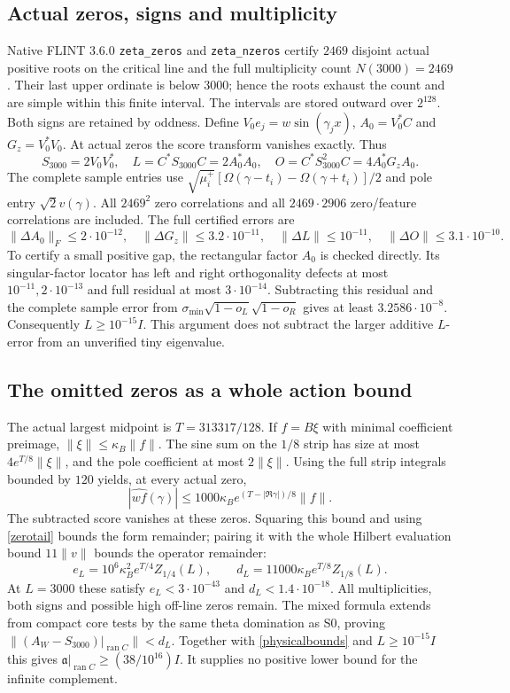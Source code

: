 \documentclass[11pt]{article}
\newcommand{\Ran}{\operatorname{ran}}
\numberwithin{equation}{section}
\begin{document}
\subsection{Actual zeros, signs and multiplicity}
Native FLINT 3.6.0 \texttt{zeta\_zeros} and \texttt{zeta\_nzeros}
\cite{FLINT} certify $2469$ disjoint actual positive roots on the
critical line and the full multiplicity count $N(3000)=2469$.
Their last upper ordinate is below $3000$; hence the roots exhaust
the count and are simple within this finite interval. The intervals
are stored outward over $2^{128}$. Both signs are retained by oddness.
Define $V_0e_j=w\sin(\gamma_jx)$, $A_0=V_0^*C$ and $G_z=V_0^*V_0$.
At actual zeros the score transform vanishes exactly. Thus
\[
 S_{3000}=2V_0V_0^*,\quad L=C^*S_{3000}C=2A_0^*A_0,
 \quad O=C^*S_{3000}^2C=4A_0^*G_zA_0.
\]
The complete sample entries use
$\sqrt{\mu_i^+}[\Omega(\gamma-t_i)-\Omega(\gamma+t_i)]/2$
and pole entry $\sqrt2v(\gamma)$. All $2469^2$ zero correlations and
all $2469\cdot2906$ zero/feature correlations are included.
The full certified errors are
\[
 \|\Delta A_0\|_F\le2\cdot10^{-12},\quad
 \|\Delta G_z\|\le3.2\cdot10^{-11},\quad
 \|\Delta L\|\le10^{-11},\quad\|\Delta O\|\le3.1\cdot10^{-10}.
\]
To certify a small positive gap, the rectangular factor $A_0$ is
checked directly. Its singular-factor locator has left and right
orthogonality defects at most $10^{-11},2\cdot10^{-13}$ and full
residual at most $3\cdot10^{-14}$. Subtracting this residual and
the complete sample error from
$\sigma_{\min}\sqrt{1-o_L}\sqrt{1-o_R}$ gives at least
$3.2586\cdot10^{-8}$. Consequently $L\ge10^{-15}I$.
This argument does not subtract the larger additive $L$-error from
an unverified tiny eigenvalue.

\subsection{The omitted zeros as a whole action bound}
The actual largest midpoint is $T=313317/128$. If $f=B\xi$ with
minimal coefficient preimage, $\|\xi\|\le\kappa_B\|f\|$.
The sine sum on the $1/8$ strip has size at most
$4e^{T/8}\|\xi\|$, and the pole coefficient at most $2\|\xi\|$.
Using the full strip integrals bounded by $120$ yields, at every
actual zero,
\[
 |\widehat{wf}(\gamma)|\le1000\kappa_B
       e^{(T-|\Re\gamma|)/8}\|f\|.
\]
The subtracted score vanishes at these zeros. Squaring this bound and
using \eqref{zerotail} bounds the form remainder; pairing it with the
whole Hilbert evaluation bound $11\|v\|$ bounds the operator remainder:
\[
 e_L=10^6\kappa_B^2e^{T/4}Z_{1/4}(L),\qquad
 d_L=11000\kappa_Be^{T/8}Z_{1/8}(L).
\]
At $L=3000$ these satisfy $e_L<3\cdot10^{-43}$ and
$d_L<1.4\cdot10^{-18}$. All multiplicities, both signs and possible
high off-line zeros remain. The mixed formula extends from compact
core tests by the same theta domination as S0, proving
$\|(A_W-S_{3000})|_{\Ran C}\|<d_L$.
Together with \eqref{physicalbounds} and $L\ge10^{-15}I$ this gives
$\mathfrak a|_{\Ran C}\ge(38/10^{16})I$. It supplies no positive
lower bound for the infinite complement.
\end{document}
